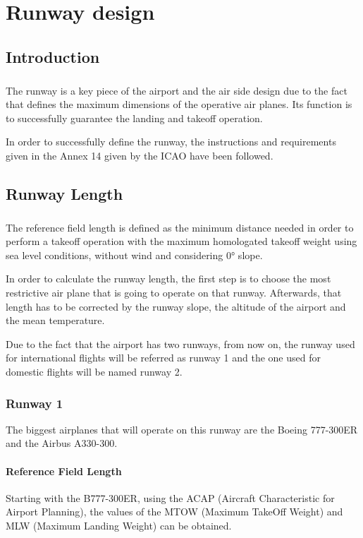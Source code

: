 \chapter{Runway design}

	\section{Introduction}
	\paragraph{} The runway is a key piece of the airport and the air side design due to the fact that defines the maximum dimensions of the operative air planes. Its function is to successfully guarantee the landing and takeoff operation.
	
	In order to successfully define the runway, the instructions and requirements given in the Annex 14 given by the ICAO have been followed. 

	\section{Runway Length}
	\paragraph{} The reference field length is defined as the minimum distance needed in order to perform a takeoff operation with the maximum homologated takeoff weight using sea level conditions, without wind and considering 0° slope.  

	In order to calculate the runway length, the first step is to choose the most restrictive air plane that is going to operate on that runway. Afterwards, that length has to be corrected by the runway slope, the altitude of the airport and the mean temperature.

	Due to the fact that the airport has two runways, from now on, the runway used for international flights will be referred as runway 1 and the one used for domestic flights will be named runway 2. 
	
		\subsection{Runway 1}
		The biggest airplanes that will operate on this runway are the Boeing 777-300ER and the Airbus A330-300. 
		
			\subsubsection{Reference Field Length}
			Starting with the B777-300ER, using the ACAP (Aircraft Characteristic for Airport Planning), the values of the MTOW (Maximum TakeOff Weight) and MLW (Maximum Landing Weight) can be obtained. 
			
